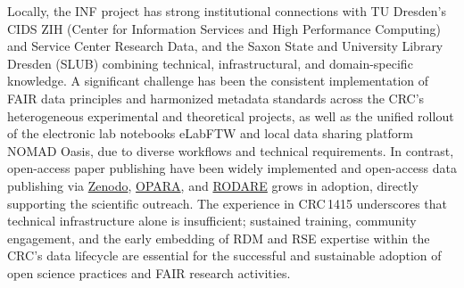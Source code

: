 \documentclass{eceasst}
\begin{document}
Locally, the INF project has strong institutional connections with TU Dresden’s CIDS ZIH (Center for Information Services and High Performance Computing)
and Service Center Research Data, and the Saxon State and University Library Dresden (SLUB)
combining technical, infrastructural, and domain-specific knowledge.
A significant challenge has been the consistent implementation of FAIR data principles and harmonized metadata standards across the CRC’s heterogeneous experimental and theoretical projects,
as well as the unified rollout of the electronic lab notebooks eLabFTW and local data sharing platform NOMAD Oasis, due to diverse workflows and technical requirements. 
In contrast, open-access paper publishing have been widely implemented and open-access data publishing via \href{https://zenodo.org/communities/crc1415/about}{Zenodo}, \href{https://opara.zih.tu-dresden.de/home}{OPARA}, and \href{https://rodare.hzdr.de/communities/crc1415}{RODARE} grows in adoption,
directly supporting the scientific outreach.
The experience in CRC\,1415 underscores that technical infrastructure alone is insufficient; sustained training, community engagement, and the early embedding of RDM and RSE expertise within the CRC’s data lifecycle are essential for the successful and sustainable adoption of open science practices and FAIR research activities.
\end{document}
